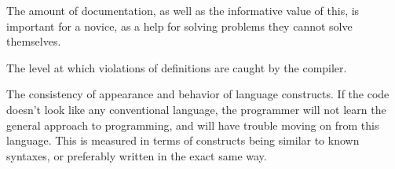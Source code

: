 \begin{description}[style=nextline]
\item[Documentation] The amount of documentation, as well as the informative value of this, is important for a novice, as a help for solving problems they cannot solve themselves.
\item[Security] The level at which violations of definitions are caught by the compiler. 
\item[Uniformity] The consistency of appearance and behavior of language constructs. If the code doesn't look like any conventional language, the programmer will not learn the general approach to programming, and will have trouble moving on from this language. This is measured in terms of constructs being similar to known syntaxes, or preferably written in the exact same way.
\end{description}